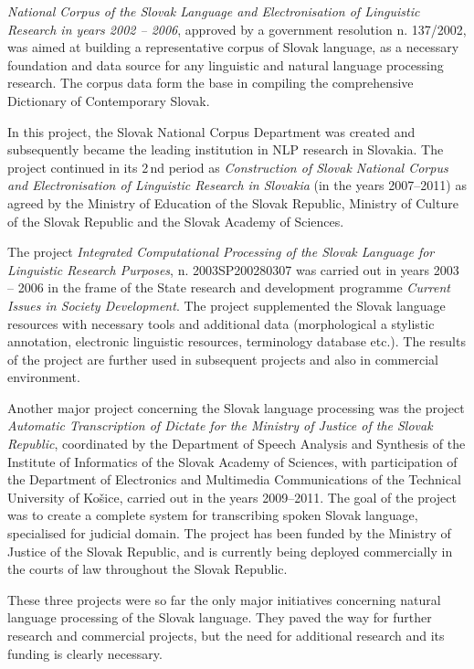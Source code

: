 \begin{multicols}{2}
{\em National Corpus of the Slovak Language and Electronisation of Linguistic
Research in years 2002 -- 2006}, approved by a government resolution n.
137/2002, was aimed at building a representative corpus of Slovak language, as a necessary foundation
and data source for any linguistic and natural language processing research.
The corpus data form the base in compiling the comprehensive Dictionary of
Contemporary Slovak.


In this project, the Slovak National Corpus Department was created and
subsequently became the leading institution in NLP research in Slovakia. The
project continued in its 2\,nd period as {\em Construction of Slovak National Corpus and Electronisation of Linguistic Research in Slovakia} (in the years 2007--2011) as agreed by the Ministry of Education of the Slovak Republic, Ministry of Culture of the Slovak Republic and the Slovak Academy of Sciences.


The project {\em Integrated Computational Processing of the Slovak Language for Linguistic
Research Purposes}, n. 2003SP200280307 was carried out in years 2003 -- 2006 in the frame of the State research and development programme {\em Current Issues in Society Development}. The project supplemented the Slovak language resources with necessary tools and additional data (morphological a stylistic annotation, electronic linguistic resources, terminology database etc.). The results of the project are further used in subsequent projects and also in commercial environment.


Another major project concerning the Slovak language processing was the project
{\em Automatic Transcription of Dictate for the Ministry of Justice of
the Slovak Republic},  coordinated by the Department of Speech Analysis
and Synthesis of the Institute of Informatics of the Slovak Academy of
Sciences, with participation of the Department of Electronics and
Multimedia Communications of the Technical University of Košice,
carried out in the years 2009--2011. The goal of the project was to
create a complete system for transcribing spoken Slovak language,
specialised for judicial domain. The project has been funded by the
Ministry of Justice of the Slovak Republic, and is currently being
deployed commercially in the courts of law throughout the Slovak
Republic.

These three projects were so far the only major initiatives concerning natural
language processing of the Slovak language. They paved the way for further
research and commercial projects, but the need for additional research and its funding is clearly necessary.


\end{multicols}
